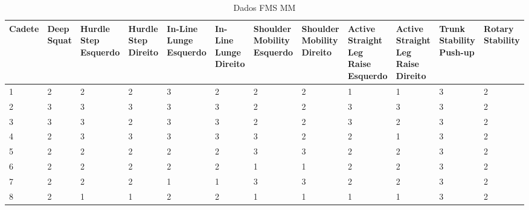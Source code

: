 \begin{landscape}
    
    \begin{table}[h]
        \centering
        \caption{Dados FMS \acrlong{MM}}
        \label{tab:fmsMM}
        \renewcommand{\arraystretch}{1.3}  %
        \begin{adjustbox}{scale=0.9}
        \begin{tabular}{|p{1.8cm}|p{1.6cm}|p{1.6cm}|p{1.6cm}|p{1.6cm}|p{1.6cm}|p{1.6cm}|p{1.6cm}|p{1.6cm}|p{1.6cm}|p{1.6cm}|p{1.6cm}|}
            \hline
            \textbf{Cadete} & \textbf{Deep Squat} & \textbf{Hurdle Step Esquerdo} & \textbf{Hurdle Step Direito} & \textbf{In-Line Lunge Esquerdo} & \textbf{In-Line Lunge Direito} & \textbf{Shoulder Mobility Esquerdo} & \textbf{Shoulder Mobility Direito} & \textbf{Active Straight Leg Raise Esquerdo} & \textbf{Active Straight Leg Raise Direito} & \textbf{Trunk Stability Push-up} & \textbf{Rotary Stability} \\
            \hline
            1 & 2 & 2 & 2 & 3 & 2 & 2 & 2 & 1 & 1 & 3 & 2 \\
            2 & 3 & 3 & 3 & 3 & 3 & 2 & 2 & 3 & 3 & 3 & 2 \\
            3 & 3 & 3 & 2 & 3 & 3 & 2 & 2 & 3 & 2 & 3 & 2 \\
            4 & 2 & 3 & 3 & 3 & 3 & 3 & 2 & 2 & 1 & 3 & 2 \\
            5 & 2 & 2 & 2 & 2 & 2 & 3 & 3 & 2 & 2 & 3 & 2 \\
            6 & 2 & 2 & 2 & 2 & 2 & 1 & 1 & 2 & 2 & 3 & 2 \\
            7 & 2 & 2 & 2 & 1 & 1 & 3 & 3 & 2 & 2 & 3 & 2 \\
            8 & 2 & 1 & 1 & 2 & 2 & 1 & 1 & 1 & 1 & 3 & 2 \\
            \hline
        \end{tabular}
        \end{adjustbox}
    \end{table}
    

\end{landscape}
